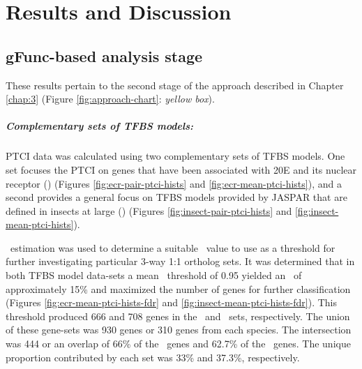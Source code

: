 

\chapter{Results and Discussion} \label{chap:4}

% 

\section{gFunc-based analysis stage}

These results pertain to the second stage of the approach described in Chapter \ref{chap:3} (Figure \ref{fig:approach-chart}: \textit{yellow box}).

\paragraph*{Complementary sets of TFBS models:}
\gls{PTCI} data was calculated using two complementary sets of \gls{TFBS} models.
%
One set focuses the \gls{PTCI} on genes that have been associated with \gls{20E} and its nuclear receptor (\PTCIe) (Figures \ref{fig:ecr-pair-ptci-hists} and \ref{fig:ecr-mean-ptci-hists}), and a second provides a general focus on \gls{TFBS} models provided by JASPAR that are defined in insects at large (\PTCIi) (Figures \ref{fig:insect-pair-ptci-hists} and \ref{fig:insect-mean-ptci-hists}).
%




%
\FDR\ estimation was used to determine a suitable \PTCI\ value to use as a threshold for further investigating particular 3-way 1:1 ortholog sets.
%
It was determined that in both \gls{TFBS} model data-sets a mean \PTCI\ threshold of 0.95 yielded an \FDR\ of approximately 15\% and maximized the number of genes for further classification (Figures \ref{fig:ecr-mean-ptci-hists-fdr} and \ref{fig:insect-mean-ptci-hists-fdr}).
%
This threshold produced 666 and 708 genes in the \PTCIi\ and \PTCIe\ sets, respectively.
%
The union of these gene-sets was 930 genes or 310 genes from each species.
%
The intersection was 444 or an overlap of 66\% of the \PTCIi\ genes and 62.7\% of the \PTCIe\ genes.
%
The unique proportion contributed by each set was 33\% and 37.3\%, respectively.

